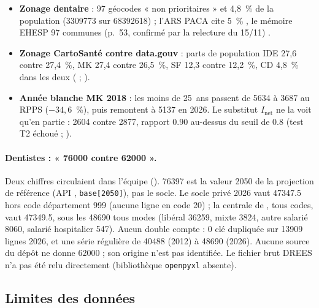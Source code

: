 \begin{itemize}
  MK ; les PH divergent (section~\ref{don:secteur}).
  \item \textbf{Zonage dentaire} : 97\mesure{} géocodes « non prioritaires » et 4,8~\%\mesure{} de la population
  (\num{3309773} sur \num{68392618}\mesure) ; l'ARS PACA cite 5~\%\mesure{} \citep{d-arspaca2025cd}, le mémoire
  EHESP 97\mesure{} communes (p.~53, confirmé par la relecture du 15/11) \citep{d-bahroun2025}.
  \item \textbf{Zonage CartoSanté contre data.gouv} : parts de population IDE 27,6 contre 27,4~\%, MK 27,4
  contre 26,5~\%, SF 12,3 contre 12,2~\%, CD 4,8~\% dans les deux\mesure{} ( ;
  \citep{d-zonagesdatagouv}).
  \item \textbf{Année blanche MK 2018} \citep{d-er1159} : les moins de 25~ans passent de \num{5634} à
  \num{3687}\mesure{} au RPPS ($-34{,}6$~\%\derive), puis remontent à \num{5137}\mesure{} en 2026. Le substitut
  $I_{\mathrm{net}}$ ne la voit qu'en partie : \num{2604} contre \num{2877}\mesure{}, rapport
  \num{0.90}\derive{} au-dessus du seuil de \num{0.8}\suppose{} (test T2 échoué ; ).
\end{itemize}

\paragraph{Dentistes : « \num{76000} contre \num{62000} ».} Deux chiffres circulaient dans l'équipe
(). \num{76397}\mesure{} est la valeur 2050 de la projection de référence (API
, \texttt{base[2050]}), pas le socle. Le socle privé 2026 vaut \num{47347.5}\mesure{} hors code département 999 (aucune ligne en code 20) ; la centrale de , tous codes, vaut \num{47349.5}\mesure{},
sous les \num{48690}\mesure{} tous modes (libéral \num{36259}, mixte \num{3824}, autre salarié \num{8060},
salarié hospitalier \num{547}\mesure). Aucun double compte : 0\mesure{} clé dupliquée sur \num{13909}\mesure{}
lignes 2026, et une série régulière de \num{40488}\mesure{} (2012) à \num{48690}\mesure{} (2026). Aucune
source du dépôt ne donne \num{62000} ; son origine n'est pas identifiée. Le fichier brut DREES n'a pas été relu
directement (bibliothèque \texttt{openpyxl} absente).

\subsection{Limites des données}\label{don:limites}

